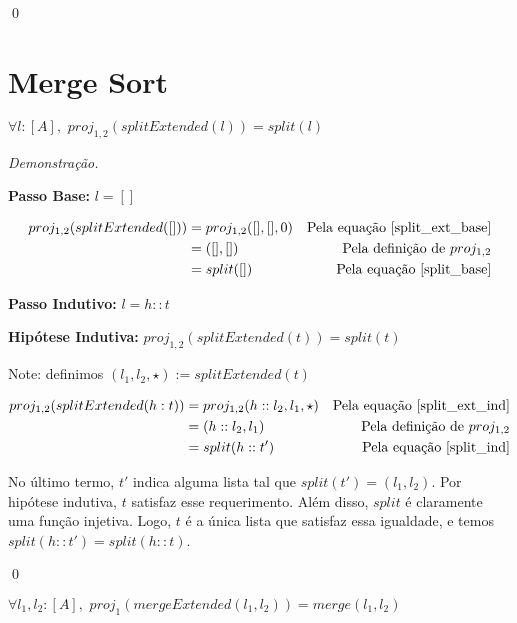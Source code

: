 \documentclass[12pt, oneside, a4paper,english,brazil]{abntex2}
\begin{document}
\qed

\section{Merge Sort}

\begin{teorema}\label{split_eq}
  $\forall l : [A], \,\, proj_{1,2}(splitExtended(l)) = split(l)$
\end{teorema}

\noindent \textit{Demonstra\c{c}\~ao.}

\textbf{Passo Base: } $l = []$

\begin{align*}
  proj_{1,2}(splitExtended([])) &= proj_{1,2}([], [], 0) &\text{Pela equa\c{c}\~ao \ref{split_ext_base}} \\
                                &= ([],[]) &\text{Pela defini\c{c}\~ao de $proj_{1,2}$} \\
  &= split([]) &\text{Pela equa\c{c}\~ao \ref{split_base}}
\end{align*}

\textbf{Passo Indutivo: } $l = h :: t$

\textbf{Hip\'otese Indutiva: } $proj_{1,2}(splitExtended(t)) = split(t)$

Note: definimos $(l_{1}, l_{2}, \star) := splitExtended(t)$

\begin{align*}
  proj_{1,2}(splitExtended(h : t)) &= proj_{1,2}(h :: l_{2}, l_{1}, \star) &\text{Pela equa\c{c}\~ao \ref{split_ext_ind}} \\
                                     &= (h :: l_{2}, l_{1}) &\text{Pela defini\c{c}\~ao de $proj_{1,2}$} \\
  &= split(h :: t') &\text{Pela equa\c{c}\~ao \ref{split_ind}}
\end{align*}

No \'ultimo termo, $t'$ indica alguma lista tal que $split(t') = (l_{1},
l_{2})$. Por hip\'otese indutiva, $t$ satisfaz esse requerimento. Al\'em disso,
$split$ \'e claramente uma fun\c{c}\~ao injetiva. Logo, $t$ \'e a \'unica lista
que satisfaz essa igualdade, e temos $split(h :: t') = split(h :: t)$.

\qed

\begin{teorema}\label{merge_eq}
  $\forall l_{1}, l_{2} : [A], \,\, proj_1(mergeExtended(l_{1}, l_{2})) = merge(l_{1}, l_{2})$
\end{teorema}
\end{document}
